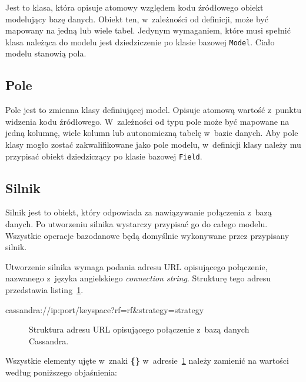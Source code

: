 Jest to klasa, która opisuje atomowy względem kodu źródłowego obiekt modelujący bazę danych. Obiekt ten, w~zależności od definicji, może być mapowany na jedną lub wiele tabel. Jedynym wymaganiem, które musi spełnić klasa należąca do modelu jest dziedziczenie po klasie bazowej \verb+Model+. Ciało modelu stanowią pola.

\subsection{Pole}

Pole jest to zmienna klasy definiującej model. Opisuje atomową wartość z~punktu widzenia kodu źródłowego. W~zależności od typu pole może być mapowane na jedną kolumnę, wiele kolumn lub autonomiczną tabelę w~bazie danych. Aby pole klasy mogło zostać zakwalifikowane jako pole modelu, w~definicji klasy należy mu przypisać obiekt dziedziczący po klasie bazowej \verb+Field+.

\subsection{Silnik}

Silnik jest to obiekt, który odpowiada za nawiązywanie połączenia z~bazą danych. Po utworzeniu silnika wystarczy przypisać go do całego modelu. Wszystkie operacje bazodanowe będą domyślnie wykonywane przez przypisany silnik. 

Utworzenie silnika wymaga podania adresu URL opisującego połączenie, nazwanego z~języka angielskiego \emph{connection string}. Strukturę tego adresu przedstawia listing~\ref{lst:connection_string}.

\begin{verbbox}[\footnotesize]
	cassandra://{ip}:{port}/{keyspace}?rf={rf}&strategy={strategy}
\end{verbbox}

\begin{figure}[ht!]
	\centering
	\theverbbox
	\caption{Struktura adresu URL opisującego połączenie z~bazą danych Cassandra.}
	\label{lst:connection_string}
\end{figure}

Wszystkie elementy ujęte w~znaki \textbf{\{\}} w~adresie~\ref{lst:connection_string} należy zamienić na wartości według poniższego objaśnienia:

